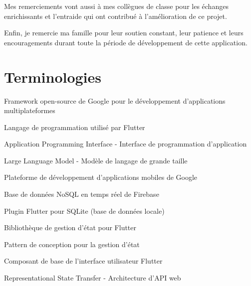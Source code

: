 \documentclass[12pt,a4paper]{report}
\begin{document}
Mes remerciements vont aussi à mes collègues de classe pour les échanges enrichissants et l'entraide qui ont contribué à l'amélioration de ce projet.

Enfin, je remercie ma famille pour leur soutien constant, leur patience et leurs encouragements durant toute la période de développement de cette application.

\newpage

\chapter*{Terminologies}

\begin{description}[leftmargin=4cm, style=nextline]
    \item[Flutter] Framework open-source de Google pour le développement d'applications multiplateformes
    
    \item[Dart] Langage de programmation utilisé par Flutter
    
    \item[API] Application Programming Interface - Interface de programmation d'application
    
    \item[LLM] Large Language Model - Modèle de langage de grande taille
    
    \item[Firebase] Plateforme de développement d'applications mobiles de Google
    
    \item[Firestore] Base de données NoSQL en temps réel de Firebase
    
    \item[Sqflite] Plugin Flutter pour SQLite (base de données locale)
    
    \item[Riverpod] Bibliothèque de gestion d'état pour Flutter
    
    \item[Provider] Pattern de conception pour la gestion d'état
    
    \item[Widget] Composant de base de l'interface utilisateur Flutter
    
    \item[REST API] Representational State Transfer - Architecture d'API web
    

\end{description}
\end{document}

